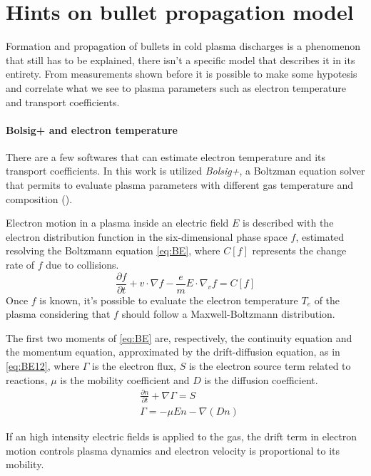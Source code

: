 \section{Hints on bullet propagation model}
Formation and propagation of bullets in cold plasma discharges is a phenomenon that still has to be explained, there isn't a specific model that describes it in its entirety.
From measurements shown before it is possible to make some hypotesis and correlate what we see to plasma parameters such as electron temperature and transport coefficients.

\paragraph{Bolsig+ and electron temperature}
There are a few softwares that can estimate electron temperature and its transport coefficients. In this work is utilized \emph{Bolsig+}, a Boltzman equation solver that permits to evaluate plasma parameters with different gas temperature and composition (\cite{Hagelaar_2005}).

Electron motion in a plasma inside an electric field $E$ is described with the electron distribution function in the six-dimensional phase space $f$, estimated resolving the Boltzmann equation \ref{eq:BE}, where $C[f]$ represents the change rate of $f$ due to collisions.
\begin{equation}
\frac{\partial f}{\partial t} + v \cdot \nabla f - \frac{e}{m} E \cdot \nabla_{v} f = C[f]
 \label{eq:BE}
\end{equation}
Once $f$ is known, it's possible to evaluate the electron temperature $T_{e}$ of the plasma considering that $f$ should follow a Maxwell-Boltzmann distribution.

The first two moments of \ref{eq:BE} are, respectively, the continuity equation and the momentum equation, approximated by the drift-diffusion equation, as in \ref{eq:BE12}, where $\Gamma$ is the electron flux, $S$ is the electron source term related to reactions, $\mu$ is the mobility coefficient and $D$ is the diffusion coefficient.
\begin{equation}
 \begin{split}
 &\frac{\partial n}{\partial t} + \nabla \Gamma = S \\
 &\Gamma = -\mu E n - \nabla (D n)
 \end{split}
 \label{eq:BE12}
\end{equation}

If an high intensity electric fields is applied to the gas, the drift term in electron motion controls plasma dynamics and electron velocity is proportional to its mobility.

